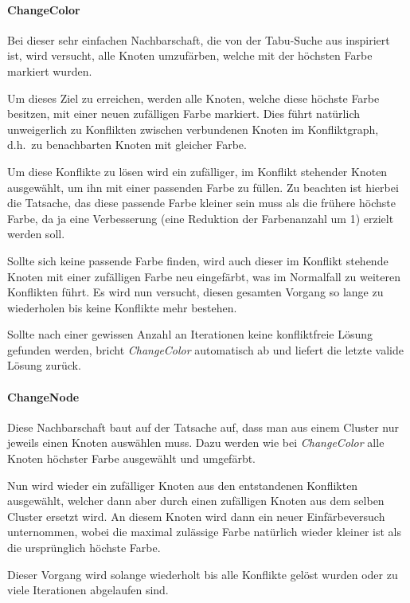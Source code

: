 \documentclass[paper=a4,fontsize=12pt]{scrartcl}
\begin{document}
\paragraph{ChangeColor}
Bei dieser sehr einfachen Nachbarschaft, die von der Tabu-Suche aus \citet*{Noronha2006} inspiriert ist, wird versucht, alle Knoten umzufärben, welche mit der höchsten Farbe markiert wurden. 

Um dieses Ziel zu erreichen, werden alle Knoten, welche diese höchste Farbe besitzen, mit einer neuen zufälligen Farbe markiert. Dies führt natürlich unweigerlich zu Konflikten zwischen verbundenen Knoten im Konfliktgraph, d.h.\ zu benachbarten Knoten mit gleicher Farbe. 

Um diese Konflikte zu lösen wird ein zufälliger, im Konflikt stehender Knoten ausgewählt, um ihn mit einer passenden Farbe zu füllen. Zu beachten ist hierbei die Tatsache, das diese passende Farbe kleiner sein muss als die frühere höchste Farbe, da ja eine Verbesserung (eine Reduktion der Farbenanzahl um 1) erzielt werden soll.

Sollte sich keine passende Farbe finden, wird auch dieser im Konflikt stehende Knoten mit einer zufälligen Farbe neu eingefärbt, was im Normalfall zu weiteren Konflikten führt. Es wird nun versucht, diesen gesamten Vorgang so lange zu wiederholen bis keine Konflikte mehr bestehen. 

Sollte nach einer gewissen Anzahl an Iterationen keine konfliktfreie Lösung gefunden werden, bricht \emph{ChangeColor} automatisch ab und liefert die letzte valide Lösung zurück.

\paragraph{ChangeNode}
Diese Nachbarschaft baut auf der Tatsache auf, dass man aus einem Cluster nur jeweils einen Knoten auswählen muss. Dazu werden wie bei \emph{ChangeColor} alle Knoten höchster Farbe ausgewählt und umgefärbt.

Nun wird wieder ein zufälliger Knoten aus den entstandenen Konflikten ausgewählt, welcher dann aber durch einen zufälligen Knoten aus dem selben Cluster ersetzt wird. An diesem Knoten wird dann ein neuer Einfärbeversuch unternommen, wobei die maximal zulässige Farbe natürlich wieder kleiner ist als die ursprünglich höchste Farbe.

Dieser Vorgang wird solange wiederholt bis alle Konflikte gelöst wurden oder zu viele Iterationen abgelaufen sind.
\end{document}
